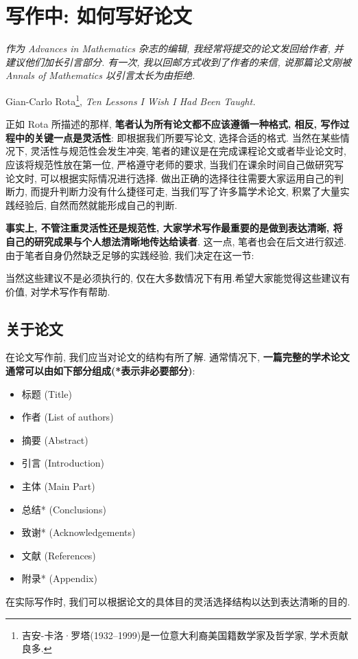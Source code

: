 \documentclass{booki}
\begin{document}
\section{写作中: 如何写好论文}
\noindent \textit{作为 Advances in Mathematics 杂志的编辑, 我经常将提交的论文发回给作者, 并建议他们加长引言部分. 有一次, 我以回邮方式收到了作者的来信, 说那篇论文刚被 Annals of Mathematics 以引言太长为由拒绝. }
\begin{flushright}
    \cndash Gian-Carlo Rota\footnote{吉安-卡洛·罗塔(1932–1999)是一位意大利裔美国籍数学家及哲学家, 学术贡献良多.}, \textit{Ten Lessons I Wish I Had Been Taught\cite{RotaTen1997}.}
\end{flushright}

正如 Rota 所描述的那样, \textbf{笔者认为所有论文都不应该遵循一种格式, 相反, 写作过程中的关键一点是灵活性}: 即根据我们所要写论文, 选择合适的格式.
当然在某些情况下, 灵活性与规范性会发生冲突, 笔者的建议是在完成课程论文或者毕业论文时, 应该将规范性放在第一位{,} 严格遵守老师的要求, 当我们在课余时间自己做研究写论文时, 可以根据实际情况进行选择.
做出正确的选择往往需要大家运用自己的判断力, 而提升判断力没有什么捷径可走, 当我们写了许多篇学术论文, 积累了大量实践经验后, 自然而然就能形成自己的判断.

\textbf{事实上, 不管注重灵活性还是规范性, 大家学术写作最重要的是做到表达清晰, 将自己的研究成果与个人想法清晰地传达给读者}. 这一点, 笔者也会在后文进行叙述.
由于笔者自身仍然缺乏足够的实践经验, 我们决定在这一节:
{\begin{center}
    \noindent{}
\end{center}}

当然这些建议不是必须执行的, 仅在大多数情况下有用.希望大家能觉得这些建议有价值, 对学术写作有帮助.
\subsection{关于论文}
{在论文写作前, 我们应当对论文的结构有所了解. 通常情况下, \textbf{一篇完整的学术论文通常可以由如下部分组成(*表示非必要部分)}:}
{\small
\begin{itemize}
    \item 标题 (Title)
    \item 作者 (List of authors)
    \item 摘要 (Abstract)
    \item 引言 (Introduction)
    \item 主体 (Main Part)
    \item 总结* (Conclusions)
    \item 致谢* (Acknowledgements)
    \item 文献 (References)
    \item 附录* (Appendix)
\end{itemize}}
{在实际写作时, 我们可以根据论文的具体目的灵活选择结构以达到表达清晰的目的.}
\end{document}
